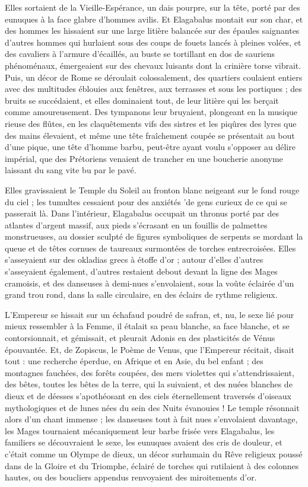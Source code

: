 \documentclass[a4paper, 11pt, oneside, polutonikogreek, french]{article}
\begin{document}
Elles sortaient de la Vieille-Espérance, un dais pourpre, sur la tête, porté par des eunuques à la face glabre d'hommes avilis. Et Elagabalus montait sur son char, et des hommes les hissaient sur une large litière balancée sur des épaules saignantes d'autres hommes qui hurlaient sous des coups de fouets lancés à pleines volées, et des cavaliers à l'armure d'écaillés, au buste se tortillant en dos de sauriens phénoménaux, émergeaient sur des chevaux luisants dont la crinière torse vibrait. Puis, un décor de Rome se déroulait colossalement, des quartiers coulaient entiers avec des multitudes éblouies aux fenêtres, aux terrasses et sous les portiques ; des bruits se succédaient, et elles dominaient tout, de leur litière qui les berçait comme amoureusement. Des tympanons leur bruyaient, plongeant en la musique rieuse des flûtes, en les claquêtements vifs des sistres et les piqûres des lyres que des mains élevaient, et même une tête fraîchement coupée se présentait au bout d'une pique, une tête d'homme barbu, peut-être ayant voulu s'opposer au délire impérial, que des Prétoriens venaient de trancher en une boucherie anonyme laissant du sang vite bu par le pavé.

Elles gravissaient le Temple du Soleil au fronton blanc neigeant sur le fond rouge du ciel ; les tumultes cessaient pour des anxiétés 'de gens curieux de ce qui se passerait là. Dans l'intérieur, Elagabalus occupait un thronus porté par des atlantes d'argent massif, aux pieds s'écrasant en un fouillis de palmettes monstrueuses, au dossier sculpté de figures symboliques de serpents se mordant la queue et de têtes cornues de taureaux surmontées de torches entrecroisées. Elles s'asseyaient sur des okladias grecs à étoffe d'or ; autour d'elles d'autres s'asseyaient également, d'autres restaient debout devant la ligne des Mages cramoisis, et des danseuses à demi-nues s'envolaient, sous la voûte éclairée d'un grand trou rond, dans la salle circulaire, en des éclairs de rythme religieux.

L'Empereur se hissait sur un échafaud poudré de safran, et, nu, le sexe lié pour mieux ressembler à la Femme, il étalait sa peau blanche, sa face blanche, et se contorsionnait, et gémissait, et pleurait Adonis en des plasticités de Vénus épouvantée. Et, de Zopiscus, le Poème de Venus, que l'Empereur récitait, disait tout : une recherche éperdue, en Afrique et en Asie, du bel enfant ; des montagnes fauchées, des forêts coupées, des mers violettes qui s'attendrissaient, des bêtes, toutes les bêtes de la terre, qui la suivaient, et des nuées blanches de dieux et de déesses s'apothéosant en des ciels éternellement traversés d'oiseaux mythologiques et de lunes nées du sein des Nuits évanouies ! Le temple résonnait alors d'un chant immense ; les danseuses tout à fait nues s'envolaient davantage, les Mages tournaient mécaniquement leur barbe frisée vers Elagabalus, les familiers se découvraient le sexe, les eunuques avaient des cris de douleur, et c'était comme un Olympe de dieux, un décor surhumain du Rêve religieux poussé dans de la Gloire et du Triomphe, éclairé de torches qui rutilaient à des colonnes hautes, ou des boucliers appendus renvoyaient des miroitements d'or.
\end{document}
